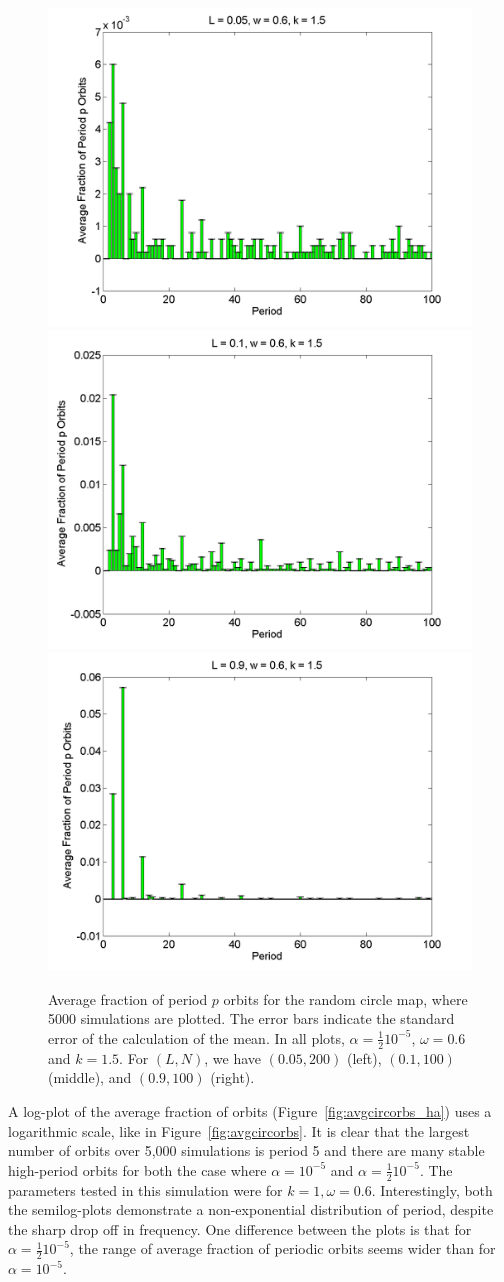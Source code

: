 \begin{figure}[H]\linespread{1}
\caption[Average fraction of period $p$ orbits for the random circle
map (uniform distribution), for $\alpha=\frac{1}{2}10^{-5}$, $\omega=0.6$ and $k=1.5$]{Average fraction of period $p$ orbits for the random circle
map, where 5000 simulations are plotted. The error bars indicate
the standard error of the calculation of the mean. In all plots,
$\alpha = \frac{1}{2}10^{-5}$, $\omega=0.6$ and $k=1.5$. For $(L,N)$,
we have $(0.05, 200)$ (left), $(0.1, 100)$
(middle), and $(0.9, 100)$ (right).}\label{fig:rcirchist_u_ha2}
	\begin{center}	\includegraphics[width=.33\textwidth]{figs/rcirc_hist_u_halfa_L_005_w_06_k_15_sims_5000.png}\hfill
\includegraphics[width=.33\textwidth]{figs/rcirc_hist_u_halfa_L_01_w_06_k_15_sims_5000.png}\hfill
\includegraphics[width=.33\textwidth]{figs/rcirc_hist_u_halfa_L_09_w_06_k_15_sims_5000.png}
	\end{center}
\end{figure}

A log-plot of the average fraction of orbits
(Figure~\ref{fig:avgcircorbs_ha}) uses a logarithmic scale, like in Figure~\ref{fig:avgcircorbs}. It is clear
that the largest number of orbits over 5,000
simulations is period 5 and there are many stable high-period orbits for both the case where $\alpha = 10^{-5}$ and $\alpha=\frac{1}{2}10^{-5}$. The parameters tested in this simulation were
for $k=1, \omega=0.6$. Interestingly, both the semilog-plots
demonstrate a non-exponential distribution of period, despite the
sharp drop off in frequency. One difference
between the plots is that for $\alpha=\frac{1}{2}10^{-5}$, the range
of average fraction of periodic orbits seems wider than for $\alpha=10^{-5}$.

